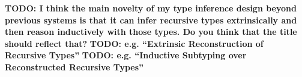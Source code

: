 \documentclass[table,dvipsnames,acmsmall]{acmart}
\theoremstyle{definition}
\begin{document}
\newcommand{\sz}[1]{\text{\small #1}}


\newcommand{\nopad}{
  \setlength{\abovedisplayskip}{4pt}
  \setlength{\belowdisplayskip}{4pt}
}

\newcommand{\examp}[1]{{\nopad \footnotesize 
\[
\begin{array}[t]{@{}l}
#1
\end{array}
\]
}}


\newcommand{\cb}[1]{
$
\begin{array}[t]{@{}l}#1\end{array}
$
}




\newcommand{\ms}[1]{{\footnotesize $(#1)$}}

\newcommand{\code}[1]{\ms{\J{#1}}}


\newcommand{\R}[1]{\color{teal}\ \ [\emph{#1}]}
 
\newcommand{\subtypes}{<:}
\newcommand{\supertypes}{:>}
\newcommand{\I}{\hspace{4mm}}
\newcommand{\Z}{.\hspace{4mm}}
\newcommand{\Alpha}{\mathrm{A}}
\newcommand{\Tau}{\mathrm{T}}
\newcommand{\B}[1]{\textbf{#1}}
\newcommand{\F}[1]{\text{#1}}
\newcommand{\bigand}{\bigwedge\nolimits}
\newcommand{\bigor}{\bigvee\nolimits}
\newcommand{\C}[1]{\color{teal} \rhd\ \emph{#1}}
\newcommand{\com}[1]{\I \emph{#1}}
\newcommand{\D}[1]{\small \textsc{#1}}
\newcommand{\FIG}[1]{Fig. {\color{red} \ref{#1}}}
\newcommand{\TODO}[1]{\noindent \B{\color{red} TODO: #1}}

\newcommand{\is}{\ ::=\ }
\newcommand{\sep}{\ \ |\ \ }
\newcommand{\nonterm}[1]{#1\ }
\newcommand{\contin}{|\ \ \ \ \ \ \ }
\newcommand{\wrt}{\B{wrt }}



\newcommand{\pc}{\hfill \break \noindent \ $\diamond$ \ }


\newcommand{\N}{\ $\cdot$\ \ }

\newcommand{\pitem}{\item[$\diamond$]}

\newcommand{\tl}{\textasciitilde{}}
\newcommand{\typdiff}{\J{\textbackslash}}

\maketitle

\TODO{
I think the main novelty of my type inference design beyond previous systems is that it can infer recursive types extrinsically and then reason inductively with those types. Do you think that the title should reflect that?
}
\TODO{
e.g. “Extrinsic Reconstruction of Recursive Types”
}
\TODO{
e.g. “Inductive Subtyping over Reconstructed Recursive Types”
}
\end{document}
